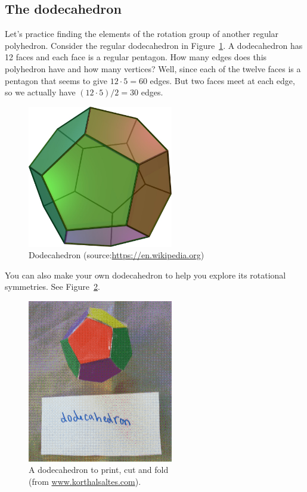 \subsection{The dodecahedron}
Let's practice finding the elements of the rotation group of another regular polyhedron.  Consider the regular dodecahedron in Figure~\ref{fig:Dodeca}.  A dodecahedron has 12 faces and each face is a regular pentagon.  How many edges does this polyhedron have and how many vertices?  Well, since each of the twelve faces is a pentagon that seems to give $12\cdot 5=60$ edges.  But two faces meet at each edge, so we actually have $(12\cdot 5)/2=30$ edges.

\begin{figure}[ht]
\begin{center}
\includegraphics[width=2.5in]{images/Dodecahedron.png}
\caption{Dodecahedron (source:\url{https://en.wikipedia.org})}
\label{fig:Dodeca}
\end{center}
\end{figure}

You can also make your own dodecahedron to help you explore its rotational symmetries. See Figure~\ref{fig:DodecaFold}.

\begin{figure}[ht]
\begin{center}
\includegraphics[width=2.5in]{images/DodecahedronFold.png}
\caption[caption]{A dodecahedron to print, cut and fold \\ \hspace{\textwidth} (from  \url{www.korthalsaltes.com}).}
 \label{fig:DodecaFold}
\end{center}
\end{figure}

